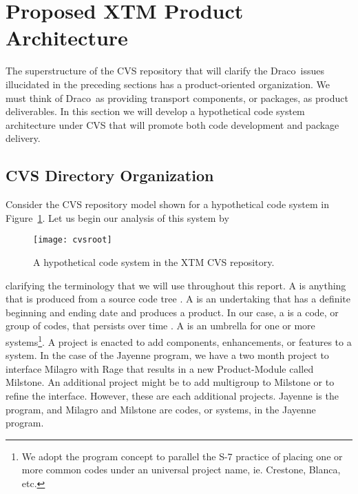 \documentclass[note]{ResearchNote_pdf}
\newcommand{\draco}{\textsf{Draco}}
\newcommand{\pkg}[1]{\textsf{#1}}
\begin{document}

\section{Proposed XTM Product Architecture}
\label{sec:architecture}

The superstructure of the CVS repository that will clarify the \draco\ 
issues illucidated in the preceding sections has a product-oriented
organization.  We must think of \draco\ as providing transport
components, or packages, as product deliverables.  In this section we
will develop a hypothetical code system architecture under CVS that will
promote both code development and package delivery.  

\subsection{CVS Directory Organization}

Consider the CVS repository model shown for a hypothetical code system
in Figure~\ref{fig:cvsroot}.  Let us begin our analysis of this system
by
\begin{figure}
  \centerline{\texttt{[image: cvsroot]}}
  \caption{A hypothetical code system in the XTM CVS repository.}
  \label{fig:cvsroot}
\end{figure}
clarifying the terminology that we will use throughout this report. A
\latin{product} is anything that is produced from a source code tree
\cite{ja94}.  A \latin{project} is an undertaking that has a definite
beginning and ending date and produces a product.  In our case, a
\latin{system} is a code, or group of codes, that persists over time
\cite{tn98}.  A \latin{program} is an umbrella for one or more
systems\footnote{We adopt the program concept to parallel the S-7
  practice of placing one or more common codes under an universal
  project name, ie.  Crestone, Blanca, etc.}.  A project is enacted to
add components, enhancements, or features to a system.  In the case of
the \pkg{Jayenne} program, we have a two month project to interface
\pkg{Milagro} with \pkg{Rage} that results in a new
\pkg{Product-Module} called \pkg{Milstone}.  An additional project
might be to add multigroup to \pkg{Milstone} or to refine the
interface.  However, these are each additional projects.
\pkg{Jayenne} is the program, and \pkg{Milagro} and \pkg{Milstone} are
codes, or systems, in the \pkg{Jayenne} program.
\end{document}
